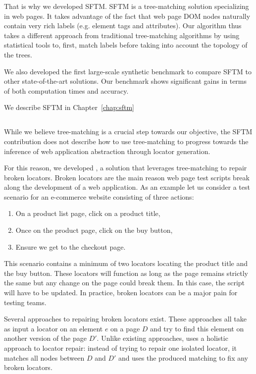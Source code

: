 That is why we developed SFTM.
SFTM is a tree-matching solution specializing in web pages. It takes advantage of the fact that web page DOM nodes naturally contain very rich labels (e.g. element tags and attributes).
Our algorithm thus takes a different approach from traditional tree-matching algorithms by using statistical tools to, first, match labels before taking into account the topology of the trees.

We also developed the first large-scale synthetic benchmark to compare SFTM to other state-of-the-art solutions. Our benchmark shows significant gains in terms of both computation times and accuracy.

We describe SFTM in Chapter~\ref{chap:sftm}

\subsection{\erratum{}}
While we believe tree-matching is a crucial step towards our objective, the SFTM contribution does not describe how to use tree-matching to progress towards the inference of web application abstraction through locator generation.

For this reason, we developed \erratum{}, a solution that leverages tree-matching to repair broken locators.
Broken locators are the main reason web page test scripts break along the development of a web application. 
As an example let us consider a test scenario for an e-commerce website consisting of three actions:
\begin{enumerate}
    \item On a product list page, click on a product title,
    \item Once on the product page, click on the buy button,
    \item Ensure we get to the checkout page.
\end{enumerate}
This scenario contains a minimum of two locators locating the product title and the buy button.
These locators will function as long as the page remains strictly the same but any change on the page could break them.
In this case, the script will have to be updated. In practice, broken locators can be a major pain for testing teams.

Several approaches to repairing broken locators exist. These approaches all take as input a locator on an element $e$ on a page $D$ and try to find this element on another version of the page $D'$.
Unlike existing approaches, \erratum{} uses a holistic approach to locator repair: instead of trying to repair one isolated locator, it matches all nodes between $D$ and $D'$ and uses the produced matching to fix any broken locators.

